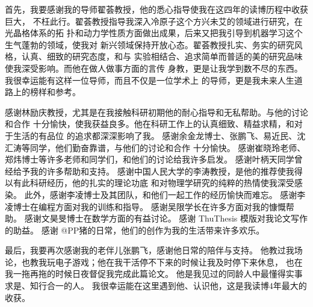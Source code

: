 \begin{acknowledgement}

首先，我要感谢我的导师翟荟教授，他的悉心指导使我在这四年的读博历程中收获巨大，
不枉此行。翟荟教授指导我深入冷原子这个方兴未艾的领域进行研究，在光晶格体系的拓
扑和动力学性质方面做出成果，后来又把我引导到机器学习这个生气蓬勃的领域，使我对
新兴领域保持开放心态。翟荟教授扎实、务实的研究风格，认真、细致的研究态度，和与
实验相结合、追求简单而普适的美的研究品味使我深受影响。而他在做人做事方面的言传
身教，更是让我学到数不尽的东西。我很幸运能有这样一位导师，而且不仅是一位学术上
的导师，更是我未来人生道路上的榜样和参考。

感谢林励庆教授，尤其是在我接触科研初期他的耐心指导和无私帮助。与他的讨论和合作
十分愉快，使我获益良多。他在科研工作上的认真细致、精益求精，和对于生活的有品位
的追求都深深影响了我。
感谢余金龙博士、张鹏飞、易近民、沈汇涛等同学，他们勤奋靠谱，与他们的讨论和合作
十分愉快。
感谢崔晓玲老师、郑炜博士等许多老师和同学们，和他们的讨论给我许多启发。
感谢叶柄天同学曾经给予我的许多帮助和支持。
感谢中国人民大学的李涛教授，是他的推荐使我得以有此科研经历，他的扎实的理论功底
和对物理学研究的纯粹的热情使我深受感染。
此外，感谢李凌博士及其团队，和他们一起工作的经历愉快而难忘。
感谢李凌博士在编程方面对我的训练和指导。
感谢吴限学长在许多方面对我的慷慨帮助。
感谢文昊旻博士在数学方面的有益讨论。
感谢 ThuThesis 模版对我论文写作的助益。
感谢 @PP猪的日常，他们的创作为我的生活带来许多欢乐。

最后，我要再次感谢我的老伴儿张鹏飞，感谢他日常的陪伴与支持。
他教过我场论，也教我玩电子游戏；他在我干活停不下来的时候让我及时停下来休息，
也在我一拖再拖的时候日夜督促我完成此篇论文。
他是我见过的同龄人中最懂得实事求是、知行合一的人。
我很幸运能在这里遇到他、认识他，这是我读博4年最大的收获。


\end{acknowledgement}
